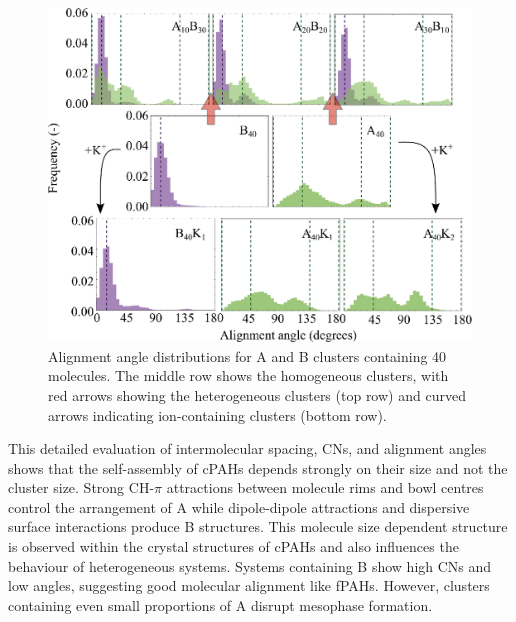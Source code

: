 \begin{figure}[!tbh]
\centering
\includegraphics[width=0.85\linewidth]{Figures/alignment_angles_hetero.eps}
\caption{Alignment angle distributions for A and B clusters containing 40 molecules. The middle row shows the homogeneous clusters, with red arrows showing the heterogeneous clusters (top row) and curved arrows indicating ion-containing clusters (bottom row).}
\label{fig:alignmentangles_hetero}
\end{figure}
%

This detailed evaluation of intermolecular spacing, CNs, and alignment angles shows that the self-assembly of cPAHs depends strongly on their size and not the cluster size. Strong CH-$\pi$ attractions between molecule rims and bowl centres control the arrangement of A while dipole-dipole attractions and dispersive surface interactions produce B structures. This molecule size dependent structure is observed within the crystal structures of cPAHs and also influences the behaviour of heterogeneous systems. Systems containing B show high CNs and low angles, suggesting good molecular alignment like fPAHs. However, clusters containing even small proportions of A disrupt mesophase formation.


